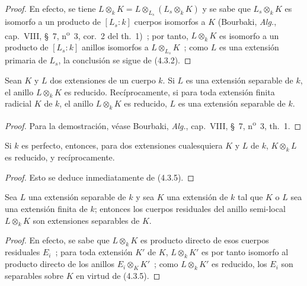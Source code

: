 \begin{proof}
En efecto, se tiene $L\otimes_k K=L\otimes_{L_s}(L_s\otimes_k K)$ y se sabe que
$L_s\otimes_k K$ es isomorfo a un producto de $[L_s:k]$ cuerpos isomorfos a
$K$ (Bourbaki, \emph{Alg.}, cap.~VIII, \S~7, n\textsuperscript{o}~3,
cor.~2 del th.~1)~; por tanto, $L\otimes_k K$ es isomorfo a un producto de
$[L_s:k]$ anillos isomorfos a $L\otimes_{L_s}K$~; como $L$ es una extensión
primaria de $L_s$, la conclusión se sigue de (4.3.2).
\end{proof}

\begin{proposition}[4.3.5]
\label{IV.2.4.3.5-fr}
Sean $K$ y $L$ dos extensiones de un cuerpo $k$. Si $L$ es una extensión
separable de $k$, el anillo $L\otimes_k K$ es reducido. Recíprocamente, si para
toda extensión finita radicial $K$ de $k$, el anillo $L\otimes_k K$ es
reducido, $L$ es una extensión separable de $k$.
\end{proposition}

\begin{proof}
Para la demostración, véase Bourbaki, \emph{Alg.}, cap.~VIII, \S~7,
n\textsuperscript{o}~3, th.~1.
\end{proof}

\begin{corollary}[4.3.6]
\label{IV.2.4.3.6-fr}
Si $k$ es perfecto, entonces, para dos extensiones cualesquiera $K$ y $L$ de
$k$, $K\otimes_k L$ es reducido, y recíprocamente.
\end{corollary}

\begin{proof}
Esto se deduce inmediatamente de (4.3.5).
\end{proof}

\begin{corollary}[4.3.7]
\label{IV.2.4.3.7-fr}
Sea $L$ una extensión separable de $k$ y sea $K$ una extensión de $k$ tal que
$K$ o $L$ sea una extensión finita de $k$; entonces los cuerpos residuales del
anillo semi-local $L\otimes_k K$ son extensiones separables de $K$.
\end{corollary}

\begin{proof}
En efecto, se sabe que $L\otimes_k K$ es producto directo de esos cuerpos
residuales $E_i$~; para toda extensión $K'$ de $K$, $L\otimes_k K'$ es por
tanto isomorfo al producto directo de los anillos $E_i\otimes_K K'$~; como
$L\otimes_k K'$ es reducido, los $E_i$ son separables sobre $K$ en virtud de
(4.3.5).
\end{proof}

